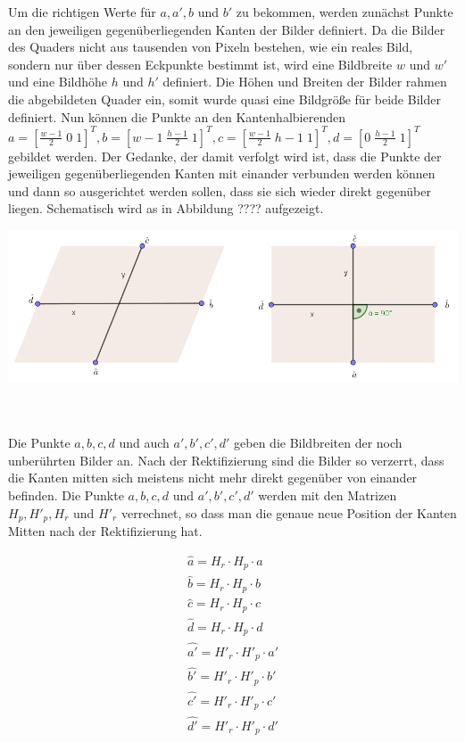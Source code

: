 Um die richtigen Werte für $a, a', b$ und $b'$ zu bekommen, werden zunächst Punkte an den jeweiligen gegenüberliegenden Kanten der Bilder definiert. Da die Bilder des Quaders nicht aus tausenden von Pixeln bestehen, wie ein reales Bild, sondern nur über dessen Eckpunkte bestimmt ist, wird eine Bildbreite $w$ und $w'$ und eine Bildhöhe $h$ und $h'$ definiert. Die Höhen und Breiten der Bilder rahmen die abgebildeten Quader ein, somit wurde quasi eine Bildgröße für beide Bilder definiert. Nun können die Punkte an den Kantenhalbierenden $a = [\frac{w-1}{2} \; 0 \; 1]^T, b = [w-1 \; \frac{h-1}{2}\; 1]^T, c = [\frac{w-1}{2} \; h-1 \; 1]^T, d = [0 \; \frac{h-1}{2} \; 1]^T$ gebildet werden. Der Gedanke, der damit verfolgt wird ist, dass die Punkte der jeweiligen gegenüberliegenden Kanten mit einander verbunden werden können und dann so ausgerichtet werden sollen, dass sie sich wieder direkt gegenüber liegen. Schematisch wird as in Abbildung ???? aufgezeigt.

\begin{minipage}{\linewidth}
	\centering
	\includegraphics[width=.8\linewidth]{images/Scherungstransformation.png}
\end{minipage}\\ \\

Die Punkte $a,b,c,d$ und auch $a',b',c',d'$ geben die Bildbreiten der noch unberührten Bilder an. Nach der Rektifizierung sind die Bilder so verzerrt, dass die Kanten mitten sich meistens nicht mehr direkt gegenüber von einander befinden. Die Punkte $a,b,c,d$ und $a',b',c',d'$ werden mit den Matrizen $H_p, H'_p, H_r$ und $H'_r$ verrechnet, so dass man die genaue neue Position der Kanten Mitten nach der Rektifizierung hat. 

\begin{gather*}
	\hat{a} = H_r\cdot H_p \cdot a\\
	\hat{b} = H_r\cdot H_p \cdot b\\
	\hat{c} = H_r\cdot H_p \cdot c\\
	\hat{d} = H_r\cdot H_p \cdot d\\
	\hat{a'} = H'_r\cdot H'_p \cdot a'\\
	\hat{b'} = H'_r\cdot H'_p \cdot b'\\
	\hat{c'} = H'_r\cdot H'_p \cdot c'\\
	\hat{d'} = H'_r\cdot H'_p \cdot d'\\
\end{gather*}

